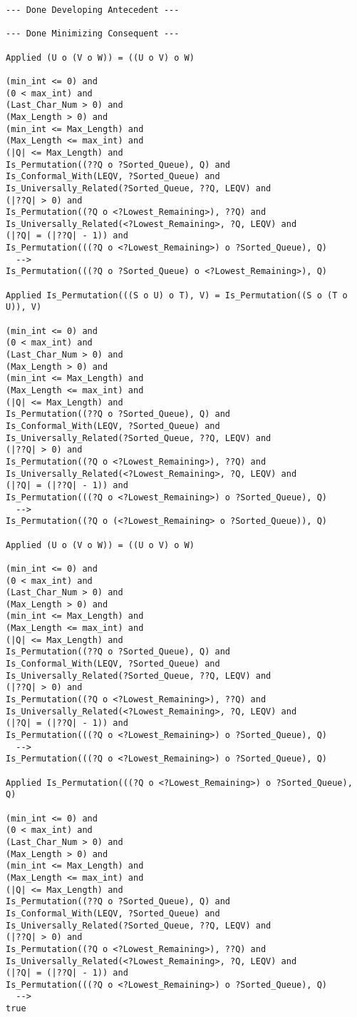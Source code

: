 \begin{lstlisting}[language=resolve]
--- Done Developing Antecedent ---

--- Done Minimizing Consequent ---

Applied (U o (V o W)) = ((U o V) o W)

(min_int <= 0) and
(0 < max_int) and
(Last_Char_Num > 0) and
(Max_Length > 0) and
(min_int <= Max_Length) and
(Max_Length <= max_int) and
(|Q| <= Max_Length) and
Is_Permutation((??Q o ?Sorted_Queue), Q) and
Is_Conformal_With(LEQV, ?Sorted_Queue) and
Is_Universally_Related(?Sorted_Queue, ??Q, LEQV) and
(|??Q| > 0) and
Is_Permutation((?Q o <?Lowest_Remaining>), ??Q) and
Is_Universally_Related(<?Lowest_Remaining>, ?Q, LEQV) and
(|?Q| = (|??Q| - 1)) and
Is_Permutation(((?Q o <?Lowest_Remaining>) o ?Sorted_Queue), Q)
  -->
Is_Permutation(((?Q o ?Sorted_Queue) o <?Lowest_Remaining>), Q)

Applied Is_Permutation(((S o U) o T), V) = Is_Permutation((S o (T o U)), V)

(min_int <= 0) and
(0 < max_int) and
(Last_Char_Num > 0) and
(Max_Length > 0) and
(min_int <= Max_Length) and
(Max_Length <= max_int) and
(|Q| <= Max_Length) and
Is_Permutation((??Q o ?Sorted_Queue), Q) and
Is_Conformal_With(LEQV, ?Sorted_Queue) and
Is_Universally_Related(?Sorted_Queue, ??Q, LEQV) and
(|??Q| > 0) and
Is_Permutation((?Q o <?Lowest_Remaining>), ??Q) and
Is_Universally_Related(<?Lowest_Remaining>, ?Q, LEQV) and
(|?Q| = (|??Q| - 1)) and
Is_Permutation(((?Q o <?Lowest_Remaining>) o ?Sorted_Queue), Q)
  -->
Is_Permutation((?Q o (<?Lowest_Remaining> o ?Sorted_Queue)), Q)

Applied (U o (V o W)) = ((U o V) o W)

(min_int <= 0) and
(0 < max_int) and
(Last_Char_Num > 0) and
(Max_Length > 0) and
(min_int <= Max_Length) and
(Max_Length <= max_int) and
(|Q| <= Max_Length) and
Is_Permutation((??Q o ?Sorted_Queue), Q) and
Is_Conformal_With(LEQV, ?Sorted_Queue) and
Is_Universally_Related(?Sorted_Queue, ??Q, LEQV) and
(|??Q| > 0) and
Is_Permutation((?Q o <?Lowest_Remaining>), ??Q) and
Is_Universally_Related(<?Lowest_Remaining>, ?Q, LEQV) and
(|?Q| = (|??Q| - 1)) and
Is_Permutation(((?Q o <?Lowest_Remaining>) o ?Sorted_Queue), Q)
  -->
Is_Permutation(((?Q o <?Lowest_Remaining>) o ?Sorted_Queue), Q)

Applied Is_Permutation(((?Q o <?Lowest_Remaining>) o ?Sorted_Queue), Q)

(min_int <= 0) and
(0 < max_int) and
(Last_Char_Num > 0) and
(Max_Length > 0) and
(min_int <= Max_Length) and
(Max_Length <= max_int) and
(|Q| <= Max_Length) and
Is_Permutation((??Q o ?Sorted_Queue), Q) and
Is_Conformal_With(LEQV, ?Sorted_Queue) and
Is_Universally_Related(?Sorted_Queue, ??Q, LEQV) and
(|??Q| > 0) and
Is_Permutation((?Q o <?Lowest_Remaining>), ??Q) and
Is_Universally_Related(<?Lowest_Remaining>, ?Q, LEQV) and
(|?Q| = (|??Q| - 1)) and
Is_Permutation(((?Q o <?Lowest_Remaining>) o ?Sorted_Queue), Q)
  -->
true


\end{lstlisting}
